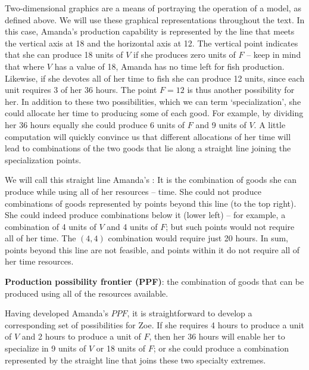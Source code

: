 Two-dimensional graphics are a means of portraying the operation of a model,
as defined above. We will use these graphical representations throughout the
text. In this case, Amanda's production capability is represented by the
line that meets the vertical axis at 18 and the horizontal axis at 12. The
vertical point indicates that she can produce 18 units of $V$ if she
produces zero units of $F$ -- keep in mind that where $V$ has a value of 18,
Amanda has no time left for fish production. Likewise, if she devotes all of
her time to fish she can produce 12 units, since each unit requires 3 of her
36 hours. The point $F=12$ is thus another possibility for her. In addition
to these two possibilities, which we can term `specialization', she could
allocate her time to producing some of each good. For example, by dividing
her 36 hours equally she could produce 6 units of $F$ and 9 units of $V$. A
little computation will quickly convince us that different allocations of
her time will lead to combinations of the two goods that lie along a
straight line joining the specialization points.

\newhtmlpage




 We will call this straight
line Amanda's : It is
the combination of goods she can produce while using all of her resources --
time. She could not produce combinations of goods represented by points
beyond this line (to the top right). She could indeed produce combinations
below it (lower left) -- for example, a combination of 4 units of $V$ and 4
units of $F$; but such points would not require all of her time. The $(4,4)$
combination would require just 20 hours. In sum, points beyond this line are
not feasible, and points within it do not require all of her time resources.

\begin{DefBox}
	\textbf{Production possibility frontier (PPF)}: the combination of goods that can be produced using all of the resources available.
\end{DefBox}

\newhtmlpage

Having developed Amanda's $PPF$, it is straightforward to develop a
corresponding set of possibilities for Zoe. If she requires 4 hours to
produce a unit of $V$ and 2 hours to produce a unit of $F$, then her 36
hours will enable her to specialize in 9 units of $V$ or 18 units of $F$; or
she could produce a combination represented by the straight line that joins
these two specialty extremes.

